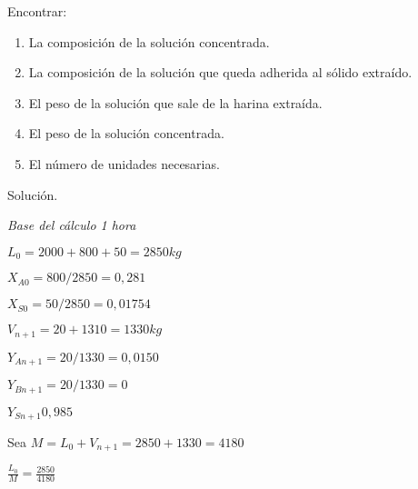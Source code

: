 \documentclass[12pt]{article}
\begin{document}
Encontrar:

\begin{enumerate}[label=\alph*)]
\item La composición de la solución concentrada. 
\item La composición de la solución que queda adherida al sólido extraído.
\item El peso de la solución que sale de la harina extraída.
\item El peso de la solución concentrada.
\item El número de unidades necesarias.
\end{enumerate}

Solución.

\textit{Base del cálculo 1 hora}

$L_0=2000+800+50 = 2850kg$

$X_{A0}=800/2850=0,281$

$X_{S0}=50/2850=0,01754$

$V_{n+1}=20+1310=1330 kg$

$Y_{A n+1}=20/1330=0,0150$

$Y_{B n+1}=20/1330=0$

$Y_{S n+1}0,985$

Sea $M = L_0+V_{n+1}=2850+1330 =4180$

$\frac{L_0}{M} = \frac{2850}{4180}$
\end{document}
